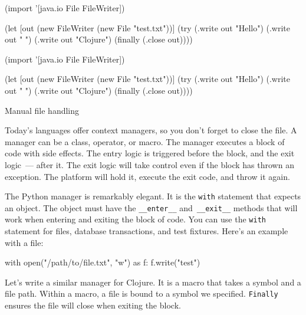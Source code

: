 \begin{listing}[ht!]

\ifx\DEVICETYPE\MOBILE

\begin{clojure}
(import '[java.io File FileWriter])

(let [out (new FileWriter
            (new File "test.txt"))]
  (try
    (.write out "Hello")
    (.write out " ")
    (.write out "Clojure")
    (finally
      (.close out))))
\end{clojure}

\else

\begin{clojure}
(import '[java.io File FileWriter])

(let [out (new FileWriter (new File "test.txt"))]
  (try
    (.write out "Hello")
    (.write out " ")
    (.write out "Clojure")
    (finally
      (.close out))))
\end{clojure}

\fi

\caption{Manual file handling}
\label{fig:write-file}

\end{listing}

Today's languages offer context managers, so you don't forget to close the file. A manager can be a class, operator, or macro.
The manager executes a block of code with side effects. The entry logic is triggered before the block, and the exit logic~--- after it. The exit logic will take control even if the block has thrown an exception.
The platform will hold it, execute the exit code, and throw it again.


The Python manager is remarkably elegant. It is the \verb|with| statement that expects an object. The object must have the \verb|__enter__| and~\verb|__exit__| methods that will work when entering and exiting the block of code. You can use the \verb|with| statement for files, database transactions, and test fixtures. Here's an example with a file:


\begin{python}
with open("/path/to/file.txt", "w") as f:
    f.write("test")
\end{python}

Let's write a similar manager for Clojure. It is a macro that takes a symbol and a file path. Within a macro, a file is bound to a symbol we specified. \verb|Finally| ensures the file will close when exiting the block.

